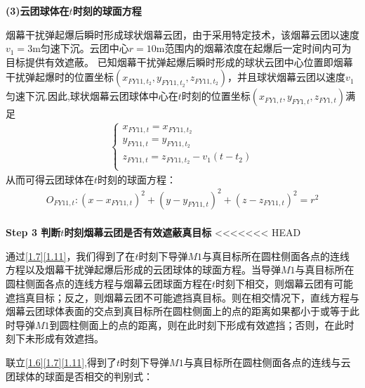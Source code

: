 \documentclass[../main.tex]{subfiles}
\begin{document}
\noindent \textbf{(3)云团球体在$t$时刻的球面方程 }
\par 烟幕干扰弹起爆后瞬时形成球状烟幕云团，由于采用特定技术，该烟幕云团以速度$v_1=3$m匀速下沉。云团中心$r=10$m范围内的烟幕浓度在起爆后一定时间内可为目标提供有效遮蔽。
已知烟幕干扰弹起爆后瞬时形成的球状云团中心位置即烟幕干扰弹起爆时的位置坐标$\left( x_{FY11,t_2},y_{FY11,t_2},z_{FY11,t_2} \right)$，并且球状烟幕云团以速度$v_1$匀速下沉.因此,球状烟幕云团球体中心在$t$时刻的位置坐标$(x_{FY1,t}, y_{FY1,{t}}, z_{FY1,{t}})$满足
\begin{align}\label{1.10}
\left\{ \begin{array}{l}
	x_{FY11,t}=x_{FY11,t_2}\\
	y_{FY11,t}=y_{FY11,t_2}\\
	z_{FY11,t}=z_{FY11,t_2}-v_1\left( t-t_2 \right)\\
\end{array} \right. 
\end{align}
从而可得云团球体在$t$时刻的球面方程：
\begin{align}\label{1.11}
O_{FY11,t}:\left( x-x_{FY11,t} \right) ^2+\left( y-y_{FY11,t} \right) ^2+\left( z-z_{FY11,t} \right) ^2=r^2 
\end{align}
\\
\textbf{Step 3 判断$t$时刻烟幕云团是否有效遮蔽真目标}
<<<<<<< HEAD
\par 通过\eqref{1.7}\eqref{1.11}，我们得到了在\( t \)时刻下导弹\( M1 \)与真目标所在圆柱侧面各点的连线方程以及烟幕干扰弹起爆后形成的云团球体的球面方程。当导弹\( M1 \)与真目标所在圆柱侧面各点的连线方程与烟幕云团球面方程在$t$时刻下相交，则烟幕云团有可能遮挡真目标；反之，则烟幕云团不可能遮挡真目标。则在相交情况下，直线方程与烟幕云团球体表面的交点到真目标所在圆柱侧面上的点的距离如果都小于或等于此时导弹$M1$到圆柱侧面上的点的距离，则在此时刻下形成有效遮挡；否则，在此时刻下未形成有效遮挡。
\par 联立\eqref{1.6}\eqref{1.7}\eqref{1.11},得到了$t$时刻下导弹\( M1 \)与真目标所在圆柱侧面各点的连线与云团球体的球面是否相交的判别式：
\end{document}
